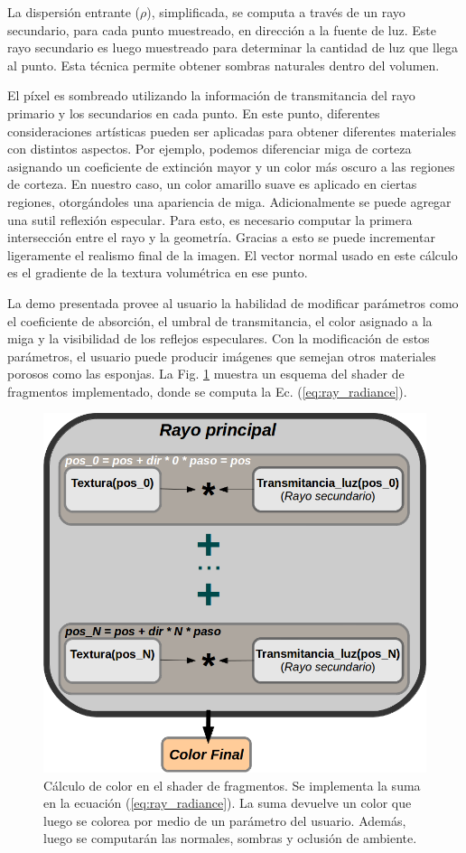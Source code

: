 La dispersión entrante ($\rho$), simplificada, se computa a través de un rayo secundario, para cada punto muestreado, en dirección a la fuente de luz.
Este rayo secundario es luego muestreado para determinar la cantidad de luz que llega al punto.
Esta técnica permite obtener sombras naturales dentro del volumen.

El píxel es sombreado utilizando la información de transmitancia del rayo primario y los secundarios en cada punto.
En este punto, diferentes consideraciones artísticas pueden ser aplicadas para obtener diferentes materiales con distintos aspectos.
Por ejemplo, podemos diferenciar miga de corteza asignando un coeficiente de extinción mayor y un color más oscuro a las regiones de corteza.
En nuestro caso, un color amarillo suave es aplicado en ciertas regiones, otorgándoles una apariencia de miga.
Adicionalmente se puede agregar una sutil reflexión especular.
Para esto, es necesario computar la primera intersección entre el rayo y la geometría.
Gracias a esto se puede incrementar ligeramente el realismo final de la imagen.
El vector normal usado en este cálculo es el gradiente de la textura volumétrica en ese punto.

La demo presentada provee al usuario la habilidad de modificar parámetros como el coeficiente de absorción, el umbral de transmitancia, el color asignado a la miga y la visibilidad de los reflejos especulares.
Con la modificación de estos parámetros, el usuario puede producir imágenes que semejan otros materiales porosos como las esponjas.
La Fig. \ref{fg:fragmentshaderrte} muestra un esquema del shader de fragmentos implementado, donde se computa la Ec. (\ref{eq:ray_radiance}).

\begin{figure}[htb!]
\centerline{\includegraphics[width=12cm]{fragmentshader}}
\caption[Cálculo de color en el shader de fragmentos]{Cálculo de color en el shader de fragmentos. Se implementa la suma en la ecuación (\ref{eq:ray_radiance}). La suma devuelve un color que luego se colorea por medio de un parámetro del usuario. Además, luego se computarán las normales, sombras y oclusión de ambiente.}
\label{fg:fragmentshaderrte}
\end{figure}


